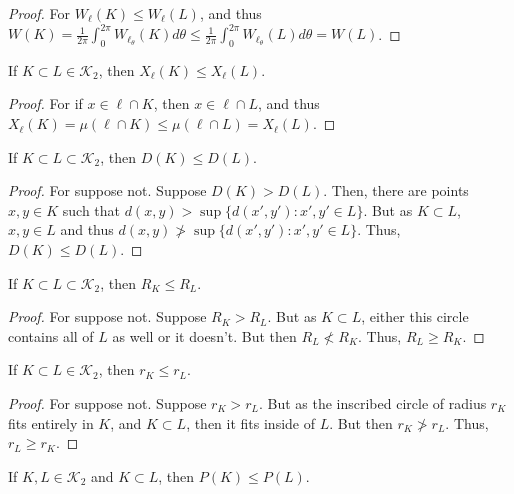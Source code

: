 \documentclass[crop=false,class=book,oneside]{standalone}
\begin{document}
            \begin{proof}
            For $W_{\ell}(K)\leq W_{\ell}(L)$, and thus $W(K)=\frac{1}{2\pi}\int_{0}^{2\pi}W_{\ell_{\theta}}(K)d\theta \leq \frac{1}{2\pi}\int_{0}^{2\pi}W_{\ell_{\theta}}(L)d\theta=W(L)$.
            \end{proof}
            \begin{theorem}
            If $K\subset L\in \mathscr{K}_2$, then $X_{\ell}(K)\leq X_{\ell}(L)$.
            \end{theorem}
            \begin{proof}
            For if $x\in \ell\cap K$, then $x\in \ell\cap L$, and thus $X_{\ell}(K)=\mu(\ell\cap K) \leq \mu(\ell\cap L)=X_{\ell}(L)$.
            \end{proof}
            \begin{theorem}
            If $K\subset L\subset \mathscr{K}_2$, then $D(K)\leq D(L)$.
            \end{theorem}
            \begin{proof}
            For suppose not. Suppose $D(K)>D(L)$. Then, there are points $x,y\in K$ such that $d(x,y)> \sup\{d(x',y'):x',y'\in L\}$. But as $K\subset L$, $x,y\in L$ and thus $d(x,y) \not> \sup\{d(x',y'):x',y'\in L\}$. Thus, $D(K)\leq D(L)$.
            \end{proof}
            \begin{theorem}
            If $K\subset L \subset \mathscr{K}_2$, then $R_K\leq R_L$.
            \end{theorem}
            \begin{proof}
            For suppose not. Suppose $R_K>R_L$. But as $K\subset L$, either this circle contains all of $L$ as well or it doesn't. But then $R_L \not<R_K$. Thus, $R_L\geq R_K$.
            \end{proof}
            \begin{theorem}
            If $K\subset L \in \mathscr{K}_2$, then $r_K \leq r_L$.
            \end{theorem}
            \begin{proof}
            For suppose not. Suppose $r_K> r_L$. But as the inscribed circle of radius $r_K$ fits entirely in $K$, and $K\subset L$, then it fits inside of $L$. But then $r_K \not > r_L$. Thus, $r_L \geq r_K$.
            \end{proof}
            \begin{theorem}
            If $K,L\in \mathscr{K}_2$ and $K\subset L$, then $P(K)\leq P(L)$.
            \end{theorem}
\end{document}
